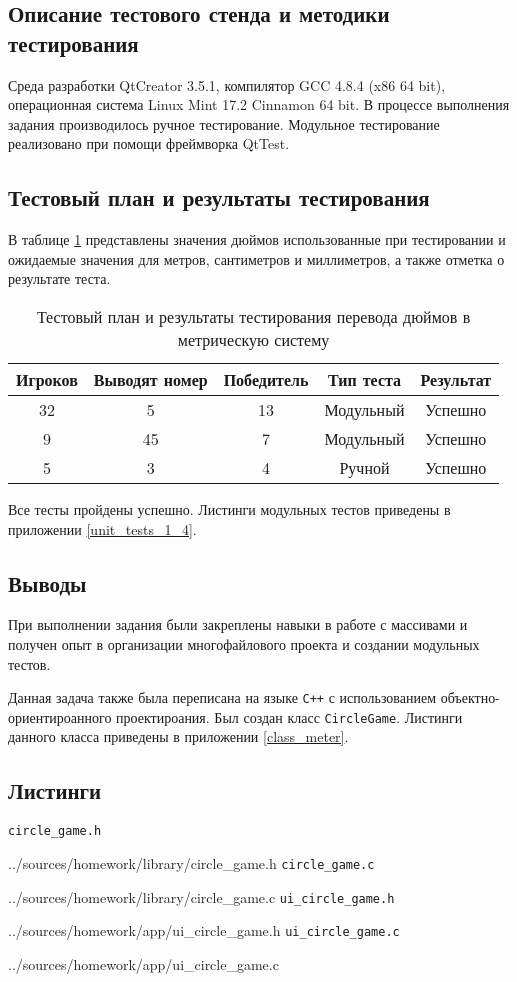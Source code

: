 \documentclass[12pt,a4paper]{report}
\begin{document}
\subsection{Описание тестового стенда и методики тестирования}
\hspace{\parindent}Среда разработки QtCreator 3.5.1, компилятор GCC 4.8.4 (x86 64 bit), операционная система Linux Mint 17.2 Cinnamon 64 bit.
В процессе выполнения задания производилось ручное тестирование.
Модульное тестирование реализовано при помощи фреймворка QtTest.

\subsection{Тестовый план и результаты тестирования}
\hspace{\parindent}В таблице \ref{inch_to_cm_test_plan} представлены значения дюймов использованные при тестировании и ожидаемые значения для метров, сантиметров и миллиметров, а также отметка о результате теста.
\FloatBarrier
\begin{table}[h]
\caption{Тестовый план и результаты тестирования перевода дюймов в метрическую систему}
\label{inch_to_cm_test_plan}
\begin{tabular}{| c c | c | c | c |}
\hline 
Игроков & Выводят номер & Победитель & Тип теста & Результат\\ 
\hline 
32 & 5 & 13 & Модульный & Успешно \\ 
\hline 
9 & 45 & 7 & Модульный & Успешно \\ 
\hline 
5 & 3 & 4 & Ручной & Успешно \\ 
\hline 
\end{tabular} 
\end{table}
\FloatBarrier
Все тесты пройдены успешно. Листинги модульных тестов приведены в приложении \ref{unit_tests_1_4}.
\subsection{Выводы}
\hspace{\parindent}При выполнении задания были закреплены навыки в работе с массивами и получен опыт в организации многофайлового проекта и создании модульных тестов.

Данная задача также была переписана на языке \verb|C++| с использованием объектно-ориентироанного проектироания. Был создан класс \verb+CircleGame+. Листинги данного класса приведены в приложении \ref{class_meter}.

\newpage
\subsection{Листинги}
\verb+circle_game.h+

{../sources/homework/library/circle_game.h}
\verb+circle_game.c+

{../sources/homework/library/circle_game.c}
\verb+ui_circle_game.h+

{../sources/homework/app/ui_circle_game.h}
\verb+ui_circle_game.c+

{../sources/homework/app/ui_circle_game.c}
\end{document}
